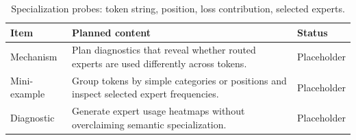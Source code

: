 \begin{table}[H]
\centering
\caption{Specialization probes: token string, position, loss contribution, selected experts.}
\label{tab:ch08-specialization-diagnostics}
\begin{tabularx}{\textwidth}{p{}X p{}}
\toprule
Item & Planned content & Status \\
\midrule
Mechanism & Plan diagnostics that reveal whether routed experts are used differently across tokens. & Placeholder \\
Mini-example & Group tokens by simple categories or positions and inspect selected expert frequencies. & Placeholder \\
Diagnostic & Generate expert usage heatmaps without overclaiming semantic specialization. & Placeholder \\
\bottomrule
\end{tabularx}
\end{table}

